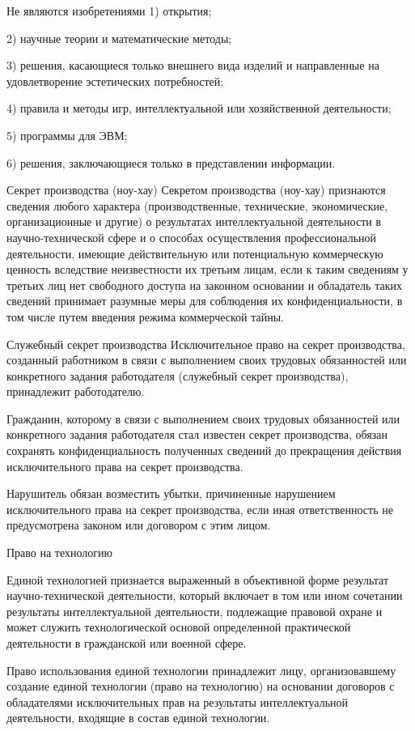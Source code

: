 \documentclass[_Venture_p2.tex]{subfiles}
\begin{document}
\begin{frame}{Не являются изобретениями}
1) открытия;

2) научные теории и математические методы;

3) решения, касающиеся только внешнего вида изделий и направленные на удовлетворение эстетических потребностей;

4) правила и методы игр, интеллектуальной или хозяйственной деятельности;

5) программы для ЭВМ;

6) решения, заключающиеся только в представлении информации.
\end{frame}

\begin{frame}[shrink=20]{Секрет производства (ноу-хау)}
Секретом производства (ноу-хау) признаются сведения любого характера (производственные, технические, экономические, организационные и другие) о результатах интеллектуальной деятельности в научно-технической сфере и о способах осуществления профессиональной деятельности, имеющие действительную или потенциальную коммерческую ценность вследствие неизвестности их третьим лицам, если к таким сведениям у третьих лиц нет свободного доступа на законном основании и обладатель таких сведений принимает разумные меры для соблюдения их конфиденциальности, в том числе путем введения режима коммерческой тайны.
\end{frame}
\begin{frame}[allowframebreaks]{\setfontsize{12pt}Служебный секрет производства}
Исключительное право на секрет производства, созданный работником в связи с выполнением своих трудовых обязанностей или конкретного задания работодателя (служебный секрет производства), принадлежит работодателю.

\pagebreak
Гражданин, которому в связи с выполнением своих трудовых обязанностей или конкретного задания работодателя стал известен секрет производства, обязан сохранять конфиденциальность полученных сведений до прекращения действия исключительного права на секрет производства.

Нарушитель обязан возместить убытки, причиненные нарушением исключительного права на секрет производства, если иная ответственность не предусмотрена законом или договором с этим лицом.
\end{frame}

\begin{frame}{Право на технологию}
\begin{block}{Единой технологией }
	\quad признается выраженный в объективной форме результат научно-технической деятельности, который включает в том или ином сочетании результаты интеллектуальной деятельности, подлежащие правовой охране и может служить технологической основой определенной практической деятельности в гражданской или военной сфере.
\end{block}
\end{frame}

\begin{frame}{Право использования единой технологии}
принадлежит лицу, организовавшему создание единой технологии (право на технологию) на основании договоров с обладателями исключительных прав на результаты интеллектуальной деятельности, входящие в состав единой технологии.
\end{frame}
\end{document}
